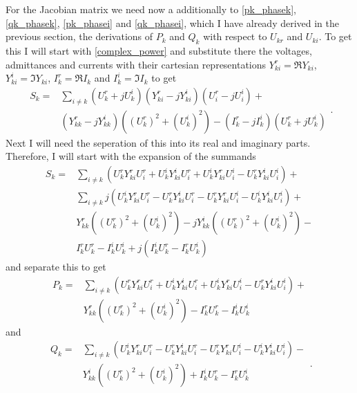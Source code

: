 For the Jacobian matrix we need now a additionally to \eqref{pk_phasek}, \eqref{qk_phasek}, \eqref{pk_phasei} and \eqref{qk_phasei}, which I have already derived in the previous section, the derivations of $P_k$ and $Q_k$ with respect to $U_{kr}$ and $U_{ki}$. To get this I will start with \eqref{complex_power} and substitute there the voltages, admittances and currents with their cartesian representations $Y_{ki}^r = \Re{Y_{ki}}$, $Y_{ki}^i = \Im{Y_{ki}}$, $I_k^r = \Re{I_k}$ and $I_k^i = \Im{I_k}$ to get
\begin{equation}
	\begin{split}
		S_k = & \sum_{i \ne k} (U_k^r + j U_k^i) (Y_{ki}^r - j Y_{ki}^i) (U_i^r - j U_i^i) + \\
			  & (Y_{kk}^r - j Y_{kk}^i) ( (U_k^r)^2 + (U_k^i)^2 ) - (I_k^r - j I_k^i) (U_k^r + j U_k^i)			
	\end{split}.
\end{equation}
Next I will need the seperation of this into its real and imaginary parts. Therefore, I will start with the expansion of the summands
\begin{equation}
	\begin{split}
		S_k = & \sum_{i \ne k} \left( U_k^r Y_{ki}^r U_i^r + U_k^i Y_{ki}^i U_i^r + U_k^i Y_{ki}^r U_i^i - U_k^r Y_{ki}^i U_i^i \right) + \\
			  & \sum_{i \ne k} j \left( U_k^i Y_{ki}^r U_i^r - U_k^r Y_{ki}^i U_i^r - U_k^r Y_{ki}^r U_i^i - U_k^i Y_{ki}^i U_i^i \right) + \\
			  & Y_{kk}^r ( (U_k^r)^2 + (U_k^i)^2 ) - j Y_{kk}^i ( (U_k^r)^2 + (U_k^i)^2 ) - \\
			  & I_k^r U_k^r - I_k^i U_k^i + j (I_k^i U_k^r - I_k^r U_k^i)
	\end{split}
\end{equation}
and separate this to get
\begin{equation}
	\begin{split}
		P_k = & \sum_{i \ne k} \left( U_k^r Y_{ki}^r U_i^r + U_k^i Y_{ki}^i U_i^r + U_k^i Y_{ki}^r U_i^i - U_k^r Y_{ki}^i U_i^i \right) + \\
			  & Y_{kk}^r ( (U_k^r)^2 + (U_k^i)^2 ) - I_k^r U_k^r - I_k^i U_k^i
	\end{split}
\end{equation}
and
\begin{equation}
	\begin{split}
		Q_k = & \sum_{i \ne k} \left( U_k^i Y_{ki}^r U_i^r - U_k^r Y_{ki}^i U_i^r - U_k^r Y_{ki}^r U_i^i - U_k^i Y_{ki}^i U_i^i \right) - \\
			  & Y_{kk}^i ( (U_k^r)^2 + (U_k^i)^2 ) + I_k^i U_k^r - I_k^r U_k^i
	\end{split}.
\end{equation}

